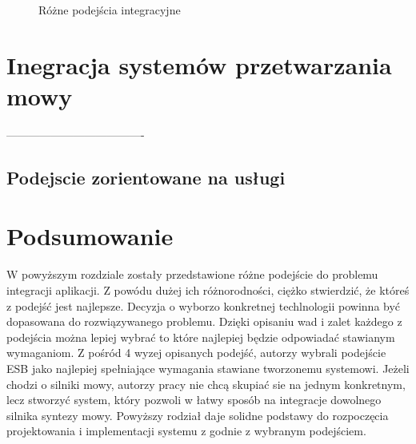 \setlength\fboxsep{20pt}
\setlength\fboxrule{1pt}
\begin{figure}[!h]
	\centering
	\caption{Różne podejścia integracyjne  \cite{chappell2004}}\label{fig:podejscia_integracyjne}
\end{figure}

\newpage

\section{Inegracja systemów przetwarzania mowy}

-------------------------------------%

\subsection {Podejscie zorientowane na usługi}
 



\newpage
\section*{Podsumowanie}
W powyższym rozdziale zostały przedstawione różne podejście do problemu integracji aplikacji. Z powódu dużej ich różnorodności, ciężko stwierdzić, że któreś z podejść jest najlepsze. Decyzja o wyborzo konkretnej techlnologii powinna być dopasowana do rozwiązywanego problemu. Dzięki opisaniu wad i zalet każdego z podejścia można lepiej wybrać to które najlepiej będzie odpowiadać stawianym wymaganiom. Z pośród 4 wyzej opisanych podejść, autorzy wybrali podejście ESB jako najlepiej spełniające wymagania stawiane tworzonemu systemowi. Jeżeli chodzi o silniki mowy, autorzy pracy nie chcą skupiać sie na jednym  konkretnym, lecz stworzyć system, który pozwoli w łatwy sposób na integracje dowolnego silnika syntezy mowy. Powyższy rodział daje solidne podstawy do rozpoczęcia projektowania i implementacji systemu z godnie z wybranym podejściem.

